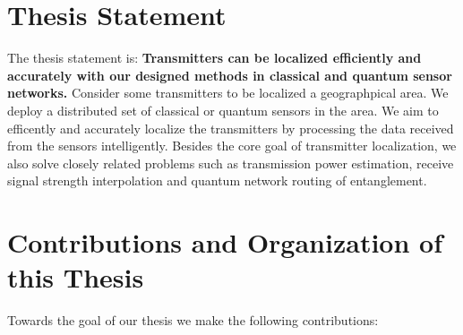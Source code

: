 \section{Thesis Statement}

The thesis statement is: \textbf{Transmitters can be localized efficiently and accurately with our designed methods in classical and quantum sensor networks.} 
Consider some transmitters to be localized a geographpical area. We deploy a distributed set of classical or quantum sensors in the area.
We aim to efficently and accurately localize the transmitters by processing the data received from the sensors intelligently.
Besides the core goal of transmitter localization, we also solve closely related problems such as transmission power estimation, 
receive signal strength interpolation and quantum network routing of entanglement.

\section{Contributions and Organization of this Thesis}

Towards the goal of our thesis we make the following contributions:


